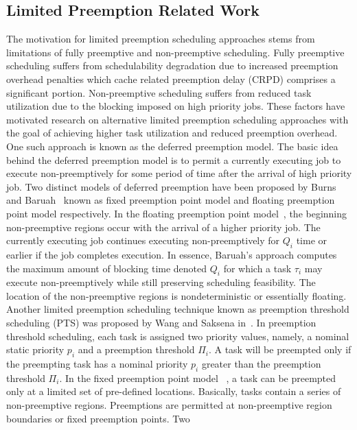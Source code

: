 \subsection {Limited Preemption Related Work}\label{sec:lp_related_work}
The motivation for limited preemption scheduling approaches stems from limitations of fully preemptive and non-preemptive scheduling.  Fully preemptive scheduling suffers from schedulability degradation due to increased preemption overhead penalties which cache related preemption delay (CRPD) comprises a significant portion.  Non-preemptive scheduling suffers from reduced task utilization due to the blocking imposed on high priority jobs.  These factors have motivated research on alternative limited preemption scheduling approaches with the goal of achieving higher task utilization and reduced preemption overhead.  One such approach is known as the deferred preemption model.  The basic idea behind the deferred preemption model is to permit a currently executing job to execute non-preemptively for some period of time after the arrival of high priority job.  Two distinct models of deferred preemption have been proposed by Burns~\cite{burns:05} and Baruah~\cite{baruah:05} known as fixed preemption point model and floating preemption point model respectively.  In the floating preemption point model~\cite{baruah:05}, the beginning non-preemptive regions occur with the arrival of a higher priority job.  The currently executing job continues executing non-preemptively for \begin{math}Q_{i}\end{math} time or earlier if the job completes execution. In essence, Baruah’s approach computes the maximum amount of blocking time denoted \begin{math}Q_{i}\end{math} for which a task \begin{math}\tau_{i}\end{math} may execute non-preemptively while still preserving scheduling feasibility. The location of the non-preemptive regions is nondeterministic or essentially floating.  Another limited preemption scheduling technique known as preemption threshold scheduling (PTS) was proposed by Wang and Saksena in~\cite{wang:99}.  In preemption threshold scheduling, each task is assigned two priority values, namely, a nominal static priority \begin{math}p_{i}\end{math} and a preemption threshold \begin{math}\Pi_{i}\end{math}.  A task will be preempted only if the preempting task has a nominal priority \begin{math}p_{i}\end{math} greater than the preemption threshold \begin{math}\Pi_{i}\end{math}. In the fixed preemption point model ~\cite{burns:05}, a task can be preempted only at a limited set of pre-defined locations. Basically, tasks contain a series of non-preemptive regions.  Preemptions are permitted at non-preemptive region boundaries or fixed preemption points. Two 
